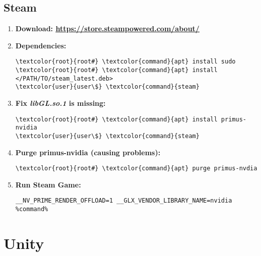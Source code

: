 \documentclass[10pt, a4paper, onecolumn, openany]{book} %
\begin{document}
\section{Steam}
\begin{enumerate}
    \item \textbf{Download: \underline{\url{https://store.steampowered.com/about/}}}
    \item \textbf{Dependencies:}
\begin{Verbatim}[commandchars=\\\{\}]
\textcolor{root}{root#} \textcolor{command}{apt} install sudo
\textcolor{root}{root#} \textcolor{command}{apt} install </PATH/TO/steam_latest.deb>
\textcolor{user}{user\$} \textcolor{command}{steam}
\end{Verbatim}
    \item \textbf{Fix \textit{libGL.so.1} is missing:}
\begin{Verbatim}[commandchars=\\\{\}]
\textcolor{root}{root#} \textcolor{command}{apt} install primus-nvidia
\textcolor{user}{user\$} \textcolor{command}{steam}
\end{Verbatim}
    \item \textbf{Purge primus-nvidia (causing problems):}
\begin{Verbatim}[commandchars=\\\{\}]
\textcolor{root}{root#} \textcolor{command}{apt} purge primus-nvdia
\end{Verbatim}
    \item \textbf{Run Steam Game:}
\begin{verbatim}
__NV_PRIME_RENDER_OFFLOAD=1 __GLX_VENDOR_LIBRARY_NAME=nvidia %command%
\end{verbatim}
\end{enumerate}
\chapter{Unity}
\end{document}
